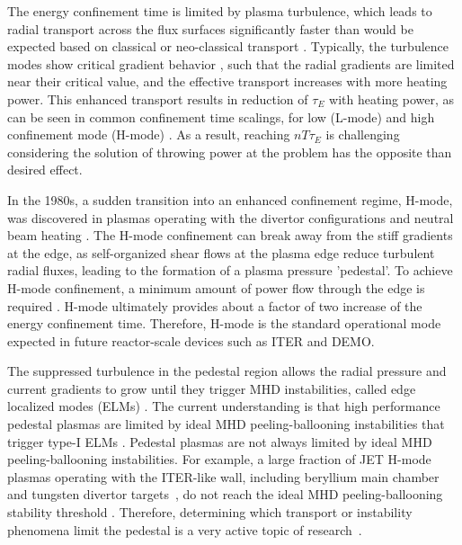 \documentclass[a4paper, twoside, final, 12pt]{article}
\begin{document}
The energy confinement time is limited by plasma turbulence, which leads to radial transport across the flux surfaces significantly faster than would be expected based on classical or neo-classical transport \cite{Ikeda_2007}.
Typically, the turbulence modes show critical gradient behavior \cite{Ikeda_2007}, such that the radial gradients are limited near their critical value, and the effective transport increases with more heating power.
This enhanced transport results in reduction of $\tau_E$ with heating power, as can be seen in common confinement time scalings, for low (L-mode) and high confinement mode (H-mode) \cite{Ikeda_2007}. As a result, reaching $nT\tau_E$ is challenging considering the solution of throwing power at the problem has the opposite than desired effect.

In the 1980s, a sudden transition into an enhanced confinement regime, H-mode, was discovered in plasmas operating with the divertor configurations and neutral beam heating \cite{PhysRevLett}.
The H-mode confinement can break away from the stiff gradients at the edge, as self-organized shear flows at the plasma edge reduce turbulent radial fluxes, leading to the formation of a plasma pressure 'pedestal'.
To achieve H-mode confinement, a minimum amount of power flow through the edge is required \cite{Martin_2008}. H-mode ultimately provides about a factor of two increase of the energy confinement time. Therefore, H-mode is the standard operational mode expected in future reactor-scale devices such as ITER and DEMO.

The suppressed turbulence in the pedestal region allows the radial pressure  and current gradients to grow until they trigger MHD instabilities, called edge localized modes (ELMs) \cite{ELM_s, Viezzer_2018}.
The current understanding is that high performance pedestal plasmas are limited by ideal MHD peeling-ballooning instabilities that trigger type-I ELMs \cite{ELM_s}.
Pedestal plasmas are not always limited by ideal MHD peeling-ballooning instabilities.
For example, a large fraction of JET H-mode plasmas operating with the ITER-like wall, including beryllium main chamber and tungsten divertor targets~\cite{PHILIPPS20101581}, do not reach the ideal MHD peeling-ballooning stability threshold \cite{Frassinetti_2020}.  Therefore, determining which transport or instability phenomena limit the pedestal is a very active topic of research~\cite{electron_transport, Catto_2013, Kotschenreuther_2019}.
\end{document}
